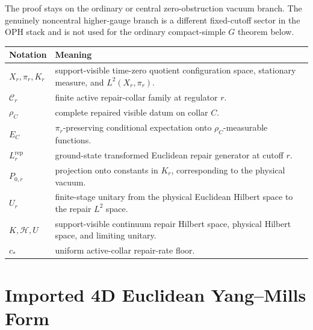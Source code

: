 \documentclass[11pt]{article}
\numberwithin{equation}{section}
\theoremstyle{remark}
\newcommand{\Rep}{\mathrm{rep}}
\newcommand{\Hcal}{\mathcal H}
\begin{document}
The proof stays on the ordinary or central zero-obstruction vacuum branch. The genuinely
noncentral higher-gauge branch is a different fixed-cutoff sector in the OPH stack and is not
used for the ordinary compact-simple \(G\) theorem below.

\begin{longtable}{@{}L{0.24\textwidth}L{0.68\textwidth}@{}}
\toprule
Notation & Meaning \\
\midrule
\endhead
\(X_r,\pi_r,K_r\) & support-visible time-zero quotient configuration space, stationary measure, and \(L^2(X_r,\pi_r)\). \\
\(\mathcal C_r\) & finite active repair-collar family at regulator \(r\). \\
\(\rho_C\) & complete repaired visible datum on collar \(C\). \\
\(E_C\) & \(\pi_r\)-preserving conditional expectation onto \(\rho_C\)-measurable functions. \\
\(L_r^{\Rep}\) & ground-state transformed Euclidean repair generator at cutoff \(r\). \\
\(P_{0,r}\) & projection onto constants in \(K_r\), corresponding to the physical vacuum. \\
\(U_r\) & finite-stage unitary from the physical Euclidean Hilbert space to the repair \(L^2\) space. \\
\(K,\Hcal,U\) & support-visible continuum repair Hilbert space, physical Hilbert space, and limiting unitary. \\
\(c_*\) & uniform active-collar repair-rate floor. \\
\bottomrule
\end{longtable}

\section{Imported 4D Euclidean Yang--Mills Form}
\end{document}
